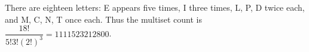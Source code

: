 There are eighteen letters: E appears five times, I three times, L, P, D twice each, and M, C, N, T once each. Thus the multiset count is $\boxed{\dfrac{18!}{5!3!(2!)^3}=1111523212800}$.
